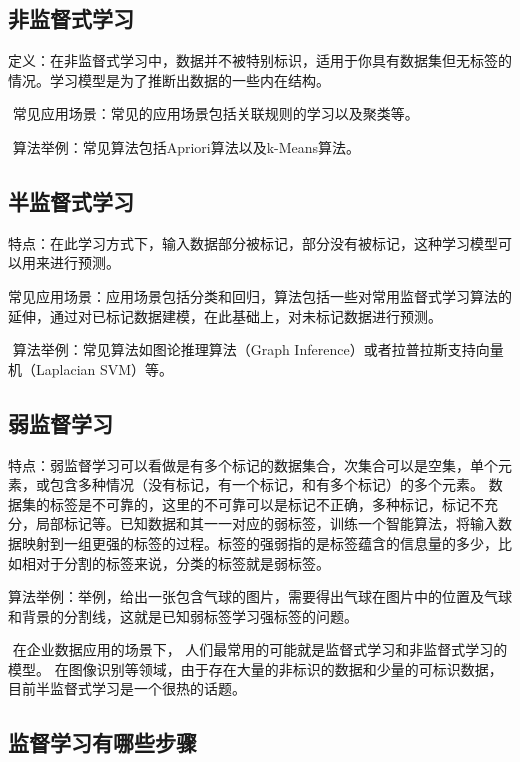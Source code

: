 \subsection{非监督式学习}\label{ux975eux76d1ux7763ux5f0fux5b66ux4e60}

​
定义：在非监督式学习中，数据并不被特别标识，适用于你具有数据集但无标签的情况。学习模型是为了推断出数据的一些内在结构。

​ 常见应用场景：常见的应用场景包括关联规则的学习以及聚类等。

​ 算法举例：常见算法包括Apriori算法以及k-Means算法。

\subsection{半监督式学习}\label{ux534aux76d1ux7763ux5f0fux5b66ux4e60}

​
特点：在此学习方式下，输入数据部分被标记，部分没有被标记，这种学习模型可以用来进行预测。

​
常见应用场景：应用场景包括分类和回归，算法包括一些对常用监督式学习算法的延伸，通过对已标记数据建模，在此基础上，对未标记数据进行预测。

​ 算法举例：常见算法如图论推理算法（Graph
Inference）或者拉普拉斯支持向量机（Laplacian SVM）等。

\subsection{弱监督学习}\label{ux5f31ux76d1ux7763ux5b66ux4e60}

​
特点：弱监督学习可以看做是有多个标记的数据集合，次集合可以是空集，单个元素，或包含多种情况（没有标记，有一个标记，和有多个标记）的多个元素。
数据集的标签是不可靠的，这里的不可靠可以是标记不正确，多种标记，标记不充分，局部标记等。已知数据和其一一对应的弱标签，训练一个智能算法，将输入数据映射到一组更强的标签的过程。标签的强弱指的是标签蕴含的信息量的多少，比如相对于分割的标签来说，分类的标签就是弱标签。

​
算法举例：举例，给出一张包含气球的图片，需要得出气球在图片中的位置及气球和背景的分割线，这就是已知弱标签学习强标签的问题。

​ 在企业数据应用的场景下，
人们最常用的可能就是监督式学习和非监督式学习的模型。
在图像识别等领域，由于存在大量的非标识的数据和少量的可标识数据，
目前半监督式学习是一个很热的话题。

\subsection{监督学习有哪些步骤}\label{ux76d1ux7763ux5b66ux4e60ux6709ux54eaux4e9bux6b65ux9aa4}

